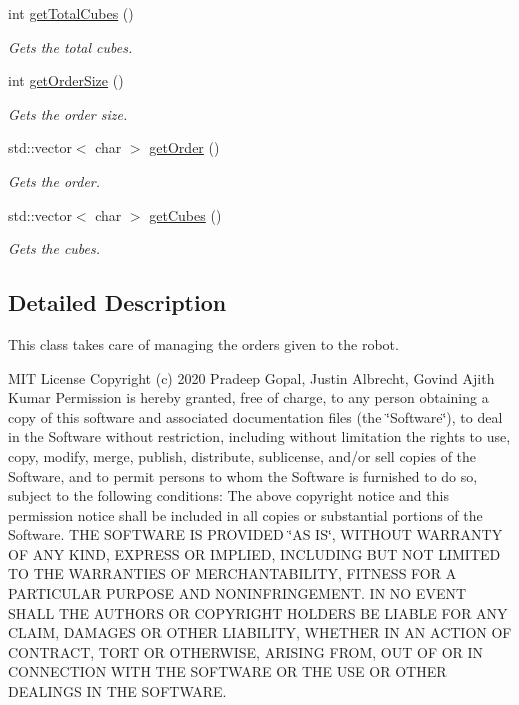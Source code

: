 \begin{DoxyCompactItemize}
int \hyperlink{class_order_manager_a51d165c55a86aca5d29f217ca7585a2d}{get\+Total\+Cubes} ()
\begin{DoxyCompactList}\small\item\em Gets the total cubes. \end{DoxyCompactList}\item 
int \hyperlink{class_order_manager_a24f95bf83688b34fe3d9c1b9a3704c03}{get\+Order\+Size} ()
\begin{DoxyCompactList}\small\item\em Gets the order size. \end{DoxyCompactList}\item 
std\+::vector$<$ char $>$ \hyperlink{class_order_manager_a678b21719b2fc90aec2b5e6f2b2bc85e}{get\+Order} ()
\begin{DoxyCompactList}\small\item\em Gets the order. \end{DoxyCompactList}\item 
std\+::vector$<$ char $>$ \hyperlink{class_order_manager_a3bc1147e66d4521ac19e57ee4ce78e4a}{get\+Cubes} ()
\begin{DoxyCompactList}\small\item\em Gets the cubes. \end{DoxyCompactList}\end{DoxyCompactItemize}


\subsection{Detailed Description}
This class takes care of managing the orders given to the robot. 

M\+IT License Copyright (c) 2020 Pradeep Gopal, Justin Albrecht, Govind Ajith Kumar Permission is hereby granted, free of charge, to any person obtaining a copy of this software and associated documentation files (the \char`\"{}\+Software\char`\"{}), to deal in the Software without restriction, including without limitation the rights to use, copy, modify, merge, publish, distribute, sublicense, and/or sell copies of the Software, and to permit persons to whom the Software is furnished to do so, subject to the following conditions\+: The above copyright notice and this permission notice shall be included in all copies or substantial portions of the Software. T\+HE S\+O\+F\+T\+W\+A\+RE IS P\+R\+O\+V\+I\+D\+ED \char`\"{}\+A\+S I\+S\char`\"{}, W\+I\+T\+H\+O\+UT W\+A\+R\+R\+A\+N\+TY OF A\+NY K\+I\+ND, E\+X\+P\+R\+E\+SS OR I\+M\+P\+L\+I\+ED, I\+N\+C\+L\+U\+D\+I\+NG B\+UT N\+OT L\+I\+M\+I\+T\+ED TO T\+HE W\+A\+R\+R\+A\+N\+T\+I\+ES OF M\+E\+R\+C\+H\+A\+N\+T\+A\+B\+I\+L\+I\+TY, F\+I\+T\+N\+E\+SS F\+OR A P\+A\+R\+T\+I\+C\+U\+L\+AR P\+U\+R\+P\+O\+SE A\+ND N\+O\+N\+I\+N\+F\+R\+I\+N\+G\+E\+M\+E\+NT. IN NO E\+V\+E\+NT S\+H\+A\+LL T\+HE A\+U\+T\+H\+O\+RS OR C\+O\+P\+Y\+R\+I\+G\+HT H\+O\+L\+D\+E\+RS BE L\+I\+A\+B\+LE F\+OR A\+NY C\+L\+A\+IM, D\+A\+M\+A\+G\+ES OR O\+T\+H\+ER L\+I\+A\+B\+I\+L\+I\+TY, W\+H\+E\+T\+H\+ER IN AN A\+C\+T\+I\+ON OF C\+O\+N\+T\+R\+A\+CT, T\+O\+RT OR O\+T\+H\+E\+R\+W\+I\+SE, A\+R\+I\+S\+I\+NG F\+R\+OM, O\+UT OF OR IN C\+O\+N\+N\+E\+C\+T\+I\+ON W\+I\+TH T\+HE S\+O\+F\+T\+W\+A\+RE OR T\+HE U\+SE OR O\+T\+H\+ER D\+E\+A\+L\+I\+N\+GS IN T\+HE S\+O\+F\+T\+W\+A\+RE. 


